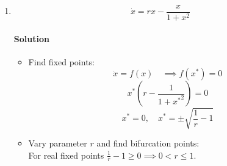 \documentclass[11pt]{article}
\begin{document}
\begin{enumerate}
\begin{itemize}
    \end{itemize}

    \item[(d)] \[\dot{x} = rx - \frac{x}{1+x^2}\]
    \paragraph{Solution}\mbox{} 
    \begin{itemize}
        \item Find fixed points:
        \[\dot{x} = f(x)\quad \implies f(x^*) = 0\]
        \[x^*\left(r - \frac{1}{1+{x^*}^2}\right) = 0\]
        \[x^* = 0,\quad x^*=\pm\sqrt{\frac{1}{r}-1}\]
        \item Vary parameter $r$ and find bifurcation points:\\
        For real fixed points $\frac{1}{r}-1 \geq 0 \implies 0<r\leq 1$.
        \begin{itemize}


\end{itemize}
\end{itemize}
\end{enumerate}
\end{document}
